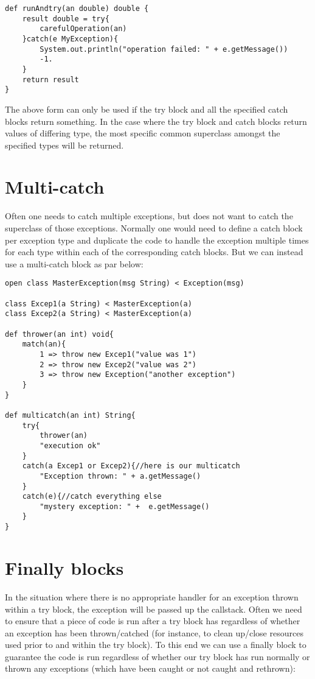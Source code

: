 \documentclass[conc-doc]{subfiles}
\begin{document}
\begin{lstlisting}
def runAndtry(an double) double {
	result double = try{
		carefulOperation(an)
	}catch(e MyException){
		System.out.println("operation failed: " + e.getMessage())
		-1.
	}
	return result
}
\end{lstlisting}

The above form can only be used if the try block and all the specified catch blocks return something. In the case where the try block and catch blocks return values of differing type, the most specific common superclass amongst the specified types will be returned.

\section{Multi-catch}
Often one needs to catch multiple exceptions, but does not want to catch the superclass of those exceptions. Normally one would need to define a catch block per exception type and duplicate the code to handle the exception multiple times for each type within each of the corresponding catch blocks. But we can instead use a multi-catch block as par below:

\begin{lstlisting}
open class MasterException(msg String) < Exception(msg)

class Excep1(a String) < MasterException(a)
class Excep2(a String) < MasterException(a)

def thrower(an int) void{
	match(an){
		1 => throw new Excep1("value was 1")
		2 => throw new Excep2("value was 2")
		3 => throw new Exception("another exception")
	}
}

def multicatch(an int) String{
	try{
		thrower(an)
		"execution ok"
	}
	catch(a Excep1 or Excep2){//here is our multicatch
		"Exception thrown: " + a.getMessage()
	}
	catch(e){//catch everything else
		"mystery exception: " +  e.getMessage()
	}
}
\end{lstlisting}

\section{Finally blocks}
In the situation where there is no appropriate handler for an exception thrown within a try block, the exception will be passed up the callstack. Often we need to ensure that a piece of code is run after a try block has regardless of whether an exception has been thrown/catched (for instance, to clean up/close resources used prior to and within the try block). To this end we can use a finally block to guarantee the code is run regardless of whether our try block has run normally or thrown any exceptions (which have been caught or not caught and rethrown):
\end{document}

